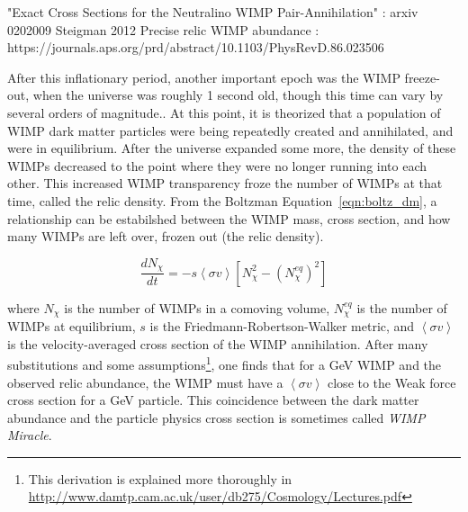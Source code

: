  "Exact Cross Sections for the Neutralino WIMP Pair-Annihilation" : arxiv 0202009
  Steigman 2012 Precise relic WIMP abundance : https://journals.aps.org/prd/abstract/10.1103/PhysRevD.86.023506
  


    After this inflationary period, another important epoch was the WIMP freeze-out, when the universe was roughly 1 second old, though this time can vary by several orders of magnitude..
    At this point, it is theorized that a population of WIMP dark matter particles were being repeatedly created and annihilated, and were in equilibrium.
    After the universe expanded some more, the density of these WIMPs decreased to the point where they were no longer running into each other.
    This increased WIMP transparency froze the number of WIMPs at that time, called the relic density.
    From the Boltzman Equation~\ref{eqn:boltz_dm}, a relationship can be estabilshed between the WIMP mass, cross section, and how many WIMPs are left over, frozen out (the relic density).
    
    \begin{equation}\label{eqn:boltz_dm}
      \frac{dN_\chi}{dt} = -s \left \langle \sigma v \right \rangle \left [ N_\chi^2 - \left ( N_\chi^{eq} \right )^2 \right ]
    \end{equation}
    
    where $N_\chi$ is the number of WIMPs in a comoving volume, $N_\chi^{eq}$ is the number of WIMPs at equilibrium, $s$ is the Friedmann-Robertson-Walker metric, and $\left \langle \sigma v \right \rangle$ is the velocity-averaged cross section of the WIMP annihilation.
    After many substitutions and some assumptions\footnote{This derivation is explained more thoroughly in \url{http://www.damtp.cam.ac.uk/user/db275/Cosmology/Lectures.pdf}}, one finds that for a \nicetilde{}GeV WIMP and the observed relic abundance, the WIMP must have a $\left \langle \sigma v \right \rangle$ close to the Weak force cross section for a \nicetilde{}GeV particle.
    This coincidence between the dark matter abundance and the particle physics cross section is sometimes called \textit{WIMP Miracle}.
    
